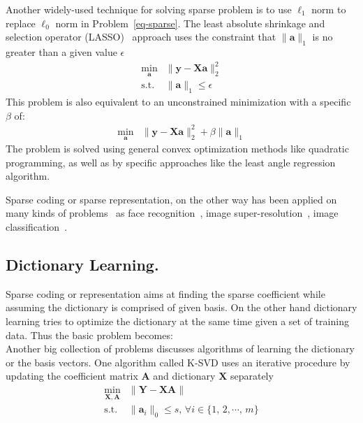 Another widely-used technique for solving sparse problem is to use $\ell_1$ norm to replace $\ell_0$ norm in Problem~\ref{eq-sparse}.
The least absolute shrinkage and selection operator (LASSO)~\cite{tibshirani1996regression} approach uses the constraint that $\|\mathbf{a}\|_1$ is no greater than a given value $\epsilon$
\begin{equation}
\begin{array}{cl}
\min_{\mathbf{a}} & \|\mathbf{y}-\mathbf{X}\mathbf{a}\|_2^2\\
\mathrm{s.t.} & \|\mathbf{a}\|_1 \leq \epsilon
\end{array}
\end{equation}
This problem is also equivalent to an unconstrained minimization with a specific $\beta$ of:
\begin{equation}
\begin{array}{cl}
\min_{\mathbf{a}} & \|\mathbf{y}-\mathbf{X}\mathbf{a}\|_2^2 + \beta \|\mathbf{a}\|_1
\end{array}
\end{equation}
The problem is solved using general convex optimization methods like quadratic programming, as well as by specific approaches like the least angle regression~\cite{efron2004least} algorithm.

Sparse coding or sparse representation, on the other way has been applied on many kinds of problems~\cite{wright2010sparse} as face recognition~\cite{wright2009robust}, image super-resolution~\cite{yang2008image}, image classification~\cite{mairal2008discriminative}.


\subsection{Dictionary Learning.}
Sparse coding or representation aims at finding the sparse coefficient while assuming the dictionary is comprised of given basis.
On the other hand dictionary learning tries to optimize the dictionary at the same time given a set of training data.
Thus the basic problem becomes:
\begin{equation}
\end{equation}
Another big collection of problems discusses algorithms of learning the dictionary or the basis vectors.
One algorithm called K-SVD uses an iterative procedure by updating the coefficient matrix $\mathbf{A}$ and dictionary $\mathbf{X}$ separately
\begin{equation}
\begin{array}{cl}
\min_{\mathbf{X},\mathbf{A}} & \|\mathbf{Y}-\mathbf{X}\mathbf{A}\| \\
\mathrm{s.t.} & \|\mathbf{a}_i\|_0 \leq s,\,\forall i\in\{1,\,2,\cdots ,\,m\}
\end{array}
\end{equation}

